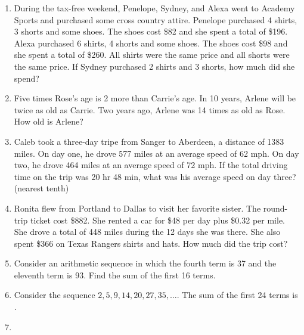 \documentclass[../uilmath.tex]{subfiles}
\begin{document}
\begin{enumerate}[label=\bfseries\arabic*.]
        \item %
        During the tax-free weekend, Penelope, Sydney, and Alexa went to Academy Sports and purchased some cross country attire. Penelope purchased 4 shirts, 3 shorts and some shoes. 
        The shoes cost \$82 and she spent a total of \$196. Alexa purchased 6 shirts, 4 shorts and some shoes. The shoes cost \$98 and she spent a total of \$260. All shirts were the same price and all shorts were the same price. 
        If Sydney purchased 2 shirts and 3 shorts, how much did she spend?

        \item %
        Five times Rose's age is 2 more than Carrie's age. In 10 years, Arlene will be twice as old as Carrie. Two years ago, Arlene was 14 times as old as Rose. How old is Arlene?

        \item %
        Caleb took a three-day tripe from Sanger to Aberdeen, a distance of 1383 miles. On day one, he drove 577 miles at an average speed of 62 mph. On day two, he drove 464 miles at an average speed of 72 mph. If the total driving time on the trip was 20 hr 48 min, what was his average speed on day three? (nearest tenth)

        \item %
        Ronita flew from Portland to Dallas to visit her favorite sister. The round-trip ticket cost \$882. She rented a car for \$48 per day plus \$0.32 per mile. She drove a total of 448 miles during the 12 days she was there. She also spent \$366 on Texas Rangers shirts and hats. How much did the trip cost?

        \item %
        Consider an arithmetic sequence in which the fourth term is 37 and the eleventh term is 93. Find the sum of the first 16 terms.

        \item %
        Consider the sequence $2,5,9,14,20,27,35,\dots$. The sum of the first 24 terms is \blank.

        \item %
        
\end{enumerate}
\end{document}
